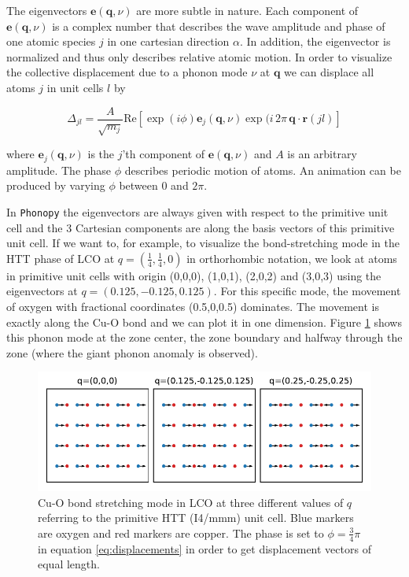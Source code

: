 The eigenvectors $\bm{e}(\bm{q}, \nu)$ are more subtle in nature. Each component of  $\bm{e}(\bm{q}, \nu)$ is a complex number that describes the wave amplitude and phase of one atomic species $j$ in one cartesian direction $\alpha$. In addition, the eigenvector is normalized and thus only describes relative atomic motion. In order to visualize the collective displacement due to a phonon mode $\nu$ at $\bm{q}$ we can displace all atoms $j$ in unit cells $l$ by

\begin{equation}
\Delta_{jl} = \frac{A}{\sqrt{m_j}} \text{Re} \left[ \exp (i\phi) \bm{e}_j(\bm{q}, \nu) \exp (i \, 2 \pi \, \bm{q} \cdot \bm{r}(jl) \right] \label{eq:displacements}
\end{equation}

\noindent where $\bm{e}_j(\bm{q}, \nu)$ is the $j$'th component of $\bm{e}(\bm{q}, \nu)$ and $A$ is an arbitrary amplitude. The phase $\phi$ describes periodic motion of atoms. An animation can be produced by varying $\phi$ between 0 and $2 \pi$.

In \texttt{Phonopy} the eigenvectors are always given with respect to the primitive unit cell and the 3 Cartesian components are along the basis vectors of this primitive unit cell. If we want to, for example, to visualize the bond-stretching mode in the HTT phase of LCO at $q=(\frac{1}{4},\frac{1}{4},0)$ in orthorhombic notation, we look at atoms in primitive unit cells with origin (0,0,0), (1,0,1), (2,0,2) and (3,0,3) using the eigenvectors at $q=(0.125,-0.125,0.125)$. For this specific mode, the movement of oxygen with fractional coordinates (0.5,0,0.5) dominates. The movement is exactly along the Cu-O bond and we can plot it in one dimension. Figure \ref{fig:bs-displacements} shows this phonon mode at the zone center, the zone boundary and halfway through the zone (where the giant phonon anomaly is observed).

\begin{figure}
	\centering
	\includegraphics{fig/temp/bs-phonons.pdf}
	\caption[bond-stretching phonons visualized]{Cu-O bond stretching mode in LCO at three different values of $q$ referring to the primitive HTT (I4/mmm) unit cell. Blue markers are oxygen and red markers are copper. The phase is set to $\phi=\frac{3}{4}\pi$ in equation \ref{eq:displacements} in order to get displacement vectors of equal length.}
	\label{fig:bs-displacements}
\end{figure}


